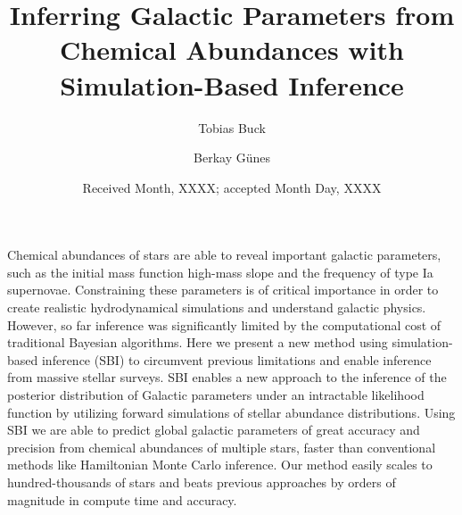 \documentclass{aa}
\begin{document}
 


   \title{Inferring Galactic Parameters from Chemical Abundances with Simulation-Based Inference}
   


   \author{Tobias Buck
          \and
          Berkay Günes
          }


   \date{Received Month, XXXX; accepted Month Day, XXXX}

 \abstract
   {Chemical abundances of stars are able to reveal important galactic parameters, such as the initial mass function high-mass slope and the frequency of type Ia supernovae. Constraining these parameters is of critical importance in order to create realistic hydrodynamical simulations and understand galactic physics. However, so far inference was significantly limited by the computational cost of traditional Bayesian algorithms. Here we present a new method using simulation-based inference (SBI) to circumvent previous limitations and enable inference from massive stellar surveys.
    SBI enables a new approach to the inference of the posterior distribution of Galactic parameters under an intractable likelihood function by utilizing forward simulations of stellar abundance distributions.
    Using SBI we are able to predict global galactic parameters of great accuracy and precision from chemical abundances of multiple stars, faster than conventional methods like Hamiltonian Monte Carlo inference. Our method easily scales to hundred-thousands of stars and beats previous approaches by orders of magnitude in compute time and accuracy.}
   {}
   {}
   {}
   {}
\end{document}
